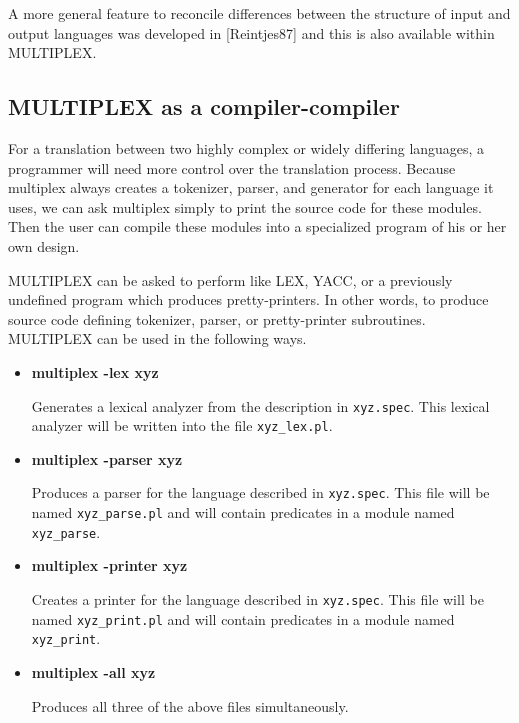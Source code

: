 A more general feature to reconcile differences between
the structure of input and output languages was developed
in [Reintjes87] and this is also available within MULTIPLEX.

\subsection{MULTIPLEX as a compiler-compiler}

For a translation between two highly complex or widely
differing languages, a programmer will need more
control over the translation process. Because multiplex
always creates a tokenizer, parser, and generator for each
language it uses, we can ask multiplex simply to print
the source code for these modules. Then the user
can compile these modules into a specialized program
of his or her own design.

MULTIPLEX can be asked to perform like LEX, YACC, or
a previously undefined program which produces pretty-printers.
In other words, to produce source code defining tokenizer,
parser, or pretty-printer subroutines.
MULTIPLEX can be used in the following ways.
\begin{itemize}
\item{\bf multiplex -lex xyz}

Generates a lexical analyzer from the description in {\tt xyz.spec}.
This lexical analyzer will be written into the file {\tt xyz\_lex.pl}.
\item{\bf multiplex -parser xyz}

Produces a parser for the language described in {\tt xyz.spec}. This
file will be named {\tt xyz\_parse.pl} and will contain
predicates in a module named {\tt xyz\_parse}.
\item{\bf multiplex -printer xyz}

Creates a printer for the language described in {\tt xyz.spec}.
This file will be named {\tt xyz\_print.pl} and will contain
predicates in a module named {\tt xyz\_print}.
\item{\bf multiplex -all xyz}

Produces all three of the above files simultaneously.
\end{itemize}

